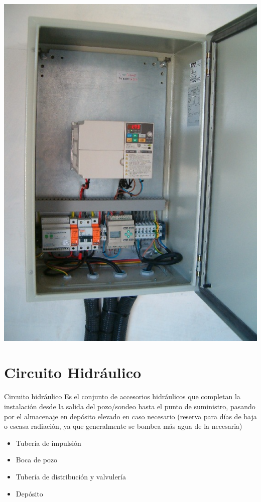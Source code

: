 \documentclass[xcolor={usenames,svgnames,dvipsnames}]{beamer}
\begin{document}
\begin{frame}[label=sec-3-0-8]{}
\includegraphics[width=.9\linewidth]{../figs/VariadorFrecuencia.jpg}
\end{frame}

\section{Circuito Hidráulico}
\label{sec-4}

\begin{frame}[label=sec-4-0-1]{Circuito hidráulico}
Es el conjunto de accesorios hidráulicos que completan la instalación
desde la salida del pozo/sondeo hasta el punto de suministro, pasando
por el almacenaje en depósito elevado en caso necesario (reserva para
días de baja o escasa radiación, ya que generalmente se bombea más agua
de la necesaria)

\begin{itemize}
\item Tubería de impulsión

\item Boca de pozo

\item Tubería de distribución y valvulería

\item Depósito
\end{itemize}
\end{frame}
\end{document}
